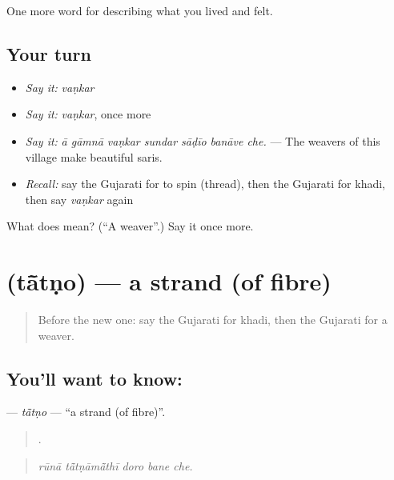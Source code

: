 \begin{grammarlens}[title={What you've built}]
One more word for describing what you lived and felt.
\end{grammarlens}

\subsection*{Your turn}
\begin{itemize}
\raggedright
  \item \emph{Say it:} \emph{vaṇkar}
  \item \emph{Say it:} \emph{vaṇkar}, once more
  \item \emph{Say it:} \emph{ā gāmnā vaṇkar sundar sāḍīo banāve che.} — The weavers of this village make beautiful saris.
  \item \emph{Recall:} say the Gujarati for to spin (thread), then the Gujarati for khadi, then say \emph{vaṇkar} again
\end{itemize}

\begin{tcolorbox}[breakable,colback=teal!4,colframe=teal!35!black,title={Before you move on}]
What does  mean? (\textquotedblleft{}A weaver\textquotedblright{}.) Say it once more.
\end{tcolorbox}
\section[\texorpdfstring{\gu{તાંતણો} (tā̃tṇo)}{તાંતણો (tā̃tṇo)}]{ (tā̃tṇo) — a strand (of fibre)}

\label{lesson:GU-C506-tatno}



\begin{quote}
Before the new one: say the Gujarati for khadi, then the Gujarati for a weaver.
\end{quote}

\subsection*{You'll want to know: }
\textbf{} — \emph{tā̃tṇo} — \textquotedblleft{}a strand (of fibre)\textquotedblright{}.

\begin{quote}
    .
\end{quote}

\begin{quote}
\emph{rūnā tā̃tṇāmā̃thī doro bane che.}
\end{quote}

